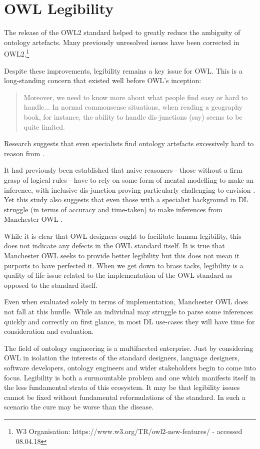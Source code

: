 \documentclass[titlepage,a4paper,12pt,oneside]{book}
\begin{document}
\section{OWL Legibility}
The release of the OWL2 standard helped to greatly reduce the ambiguity of ontology artefacts.
Many previously unresolved issues \cite[1]{problems2006} have been corrected in OWL2.\footnote{W3 Organisation: https://www.w3.org/TR/owl2-new-features/ - accessed 08.04.18}\par
Despite these improvements, legibility remains a key issue for OWL.
This is a long-standing concern that existed well before OWL's inception:
\begin{quote}
  Moreover, we need to know more about what people find easy or hard to handle... In normal commonsense situations, when reading a geography book, for instance, the ability to handle dis-junctions (say) seems to be quite limited. \cite[89]{expressiveness1987}
\end{quote}
Research suggests that even specialists find ontology artefacts excessively hard to reason from \cite[551]{usability2014}.\par
It had previously been established that naive reasoners - those without a firm grasp of logical rules - have to rely on some form of mental modelling to make an inference, with inclusive dis-junction proving particularly challenging to envision \cite[552]{usability2014}.
Yet this study also suggests that even those with a specialist background in DL struggle (in terms of accuracy and time-taken) to make inferences from Manchester OWL \cite[562]{usability2014}.\par
While it is clear that OWL designers ought to facilitate human legibility, this does not indicate any defects in the OWL standard itself.
It is true that Manchester OWL seeks to provide better legibility but this does not mean it purports to have perfected it.
When we get down to brass tacks, legibility is a quality of life issue related to the implementation of the OWL standard as opposed to the standard itself.\par
Even when evaluated solely in terms of implementation, Manchester OWL does not fall at this hurdle.
While an individual may struggle to parse some inferences quickly and correctly on first glance, in most DL use-cases they will have time for consideration and evaluation.\par
The field of ontology engineering is a multifaceted enterprise.
Just by considering OWL in isolation the interests of the standard designers, language designers, software developers, ontology engineers and wider stakeholders begin to come into focus.
Legibility is both a surmountable problem and one which manifests itself in the less fundamental strata of this ecosystem.
It may be that legibility issues cannot be fixed without fundamental reformulations of the standard.
In such a scenario the cure may be worse than the disease.
\end{document}

